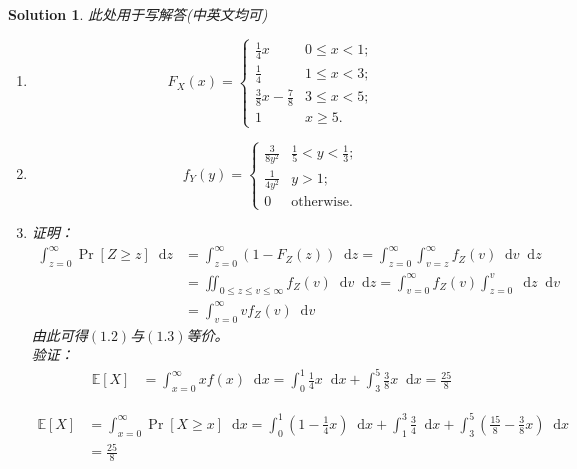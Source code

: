\documentclass[a4paper,UTF8]{article}
\numberwithin{equation}{section}
\newtheorem*{mySol}{Solution}
\newcommand*\diff{\mathop{}\!\mathrm{d}}
\begin{document}
\begin{mySol}
此处用于写解答(中英文均可)

\begin{enumerate}
	
\item 	
\begin{equation}
F_X(x) = 
\begin{cases}
\frac{1}{4}x & 0 \leq x<1;\\
\frac{1}{4} & 1 \leq x<3;\\
\frac{3}{8}x-\frac{7}{8} & 3 \leq x<5;\\ 
1 & x \geq 5 .
\end{cases}
\end{equation}

\item 
\begin{equation}
f_Y(y) =
\begin{cases}
\frac{3}{8y^2} & \frac{1}{5}<y<\frac{1}{3};\\
\frac{1}{4y^2} & y > 1;\\
0 & \mbox{otherwise.}
\end{cases}
\end{equation}

\item 
证明：
\begin{equation}
\begin{aligned}
\int_{z=0}^{\infty}\Pr[Z\geq z] \diff z 
&= \int_{z=0}^{\infty}(1-F_Z(z)) \diff z = \int_{z=0}^{\infty}\int_{v=z}^{\infty}f_Z(v) \diff v \diff z\\
&= \iint_{0 \leq z \leq v \leq \infty}f_Z(v) \diff v \diff z = \int_{v=0}^{\infty}f_Z(v)\int_{z=0}^{v}\diff z \diff v \\
&= \int_{v=0}^{\infty}vf_Z(v)\diff v
\end{aligned}
\end{equation}
由此可得$(1.2)$与$(1.3)$等价。\\
验证：
\begin{equation}
\begin{aligned}
\mathbb{E}[X] &= \int_{x=0}^{\infty}xf(x) \diff x = \int_{0}^{1}\frac{1}{4}x\diff x + \int_{3}^{5}\frac{3}{8}x\diff x =\frac{25}{8}
\end{aligned}
\end{equation}

\begin{equation}
\begin{aligned}
\mathbb{E}[X] &= \int_{x=0}^{\infty}\Pr[X\geq x] \diff x = \int_{0}^{1}(1-\frac{1}{4}x)\diff x 
+ \int_{1}^{3}\frac{3}{4}\diff x
+ \int_{3}^{5}(\frac{15}{8}-\frac{3}{8}x)\diff x\\
&= \frac{25}{8}
\end{aligned}
\end{equation}


\end{enumerate}
\end{mySol}
\end{document}
